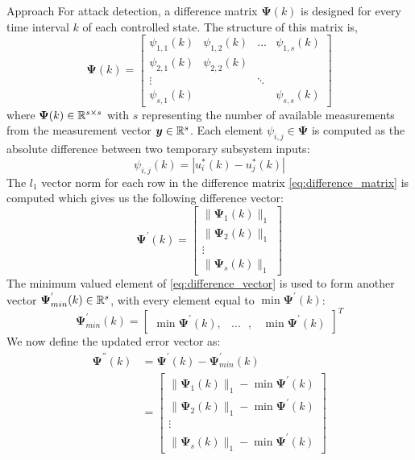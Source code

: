 \begin{section}{Approach}
For attack detection, a difference matrix $\bm{\Psi}(k)$ is designed for every time interval $k$ of each controlled state. The structure of this matrix is,
    \begin{equation}
    \label{eq:difference_matrix}
	\bm{\Psi}(k)=\begin{bmatrix} \psi_{1,1}(k) & \psi_{1,2}(k) & \dots & \psi_{1,s}(k) \\ \psi_{2,1}(k) & \psi_{2,2}(k) &  &  \\ \vdots &  & \ddots &  \\ \psi_{s,1}(k) &  &  & \psi_{s,s}(k) \end{bmatrix}
	\end{equation}
where $\bm{\Psi}(k) \in \mathbb{R}^{s\times s}$ with $s$ representing the number of available measurements from the measurement vector $\bm{y} \in \mathbb{R}^s$. Each element $\psi_{i,j}\in\bm{\Psi}$ is computed as the absolute difference between two temporary subsystem inputs:
    \begin{equation}
        \psi_{i,j}(k)=|u^*_i(k)-u^*_j(k)|
    \end{equation}
The $l_1$ vector norm for each row in the difference matrix \eqref{eq:difference_matrix} is computed which gives us the following difference vector:
    \begin{equation}
    \label{eq:difference_vector}
	\bm{\Psi^{'}}(k)=\begin{bmatrix} \lVert{\bm{\Psi}_1(k)}\rVert_1 \\ \lVert{\bm{\Psi}_2(k)}\rVert_1 \\ \vdots \\ \lVert{\bm{\Psi}_s(k)}\rVert_1 \end{bmatrix}
	\end{equation}
The minimum valued element of \eqref{eq:difference_vector} is used to form another vector $\bm{\Psi}^{'}_{min}(k) \in \mathbb{R}^s$, with every element equal to $\min \bm{\Psi}^{'}(k)$:
    \begin{equation}
	\bm{\Psi}^{'}_{min}(k)=\begin{bmatrix} \min \bm{\Psi}^{'}(k),& \dots \text{ },&\min \bm{\Psi}^{'}(k) \end{bmatrix}^T
	\end{equation}
We now define the updated error vector as:
    \begin{align}
    \label{eq:Psi2}
	\bm{\Psi^{''}}(k)&=\bm{\Psi^{'}}(k)-\bm{\Psi}^{'}_{min}(k) \\
	& =\begin{bmatrix} \lVert{\bm{\Psi}_1(k)}\rVert_1 - \min \bm{\Psi}^{'}(k)\\ \lVert{\bm{\Psi}_2(k)}\rVert_1 - \min \bm{\Psi}^{'}(k) \\ \vdots \\ \lVert{\bm{\Psi}_s(k)}\rVert_1 - \min \bm{\Psi}^{'}(k) \end{bmatrix}
	\end{align}
	

\end{section}
